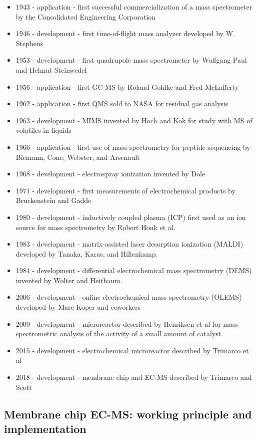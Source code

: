 \begin{itemize}
	\item 1943 - application - first successful commercialization of a mass spectrometer by the Consolidated Engineering Corporation
	\item 1946 - development - first time-of-flight mass analyzer developed by W. Stephens
	\item 1953 - development - first quadrupole mass spectrometer by Wolfgang Paul and Helmut Steinwedel
	\item 1956 - application - first GC-MS by Roland Gohlke and Fred McLafferty
	\item 1962 - application - first QMS sold to NASA for residual gas analysis
	\item 1963 - development - MIMS invented by Hoch and Kok for study with MS of volatiles in liquids
	\item 1966 - application - first use of mass spectrometry for peptide sequencing by Biemann, Cone, Webster, and Arsenault
	\item 1968 - development - electrospray ionization invented by Dole
	\item 1971 - development - first measurements of electrochemical products by Bruckenstein and Gadde
	\item 1980 - development - inductively coupled plasma (ICP) first used as an ion source for mass spectrometry by Robert Houk et al.
	\item 1983 - development - matrix-assisted laser desorption ionization (MALDI) developed by Tanaka, Karas, and Hillenkamp.
	\item 1984 - development - differential electrochemical mass spectrometry (DEMS) invented by Wolter and Heitbaum. 
	\item 2006 - development - online electrochemical mass spectrometry (OLEMS) developed by Marc Koper and coworkers
	\item 2009 - development - microreactor described by Henriksen et al for mass spectrometric analysis of the activity of a small amount of catalyst.
	\item 2015 - development - electrochemical microreactor described by Trimarco et al
	\item 2018 - development - membrane chip and EC-MS described by Trimarco and Scott
\end{itemize}


\subsection{Membrane chip EC-MS: working principle and implementation}\label{subsec:setups}

